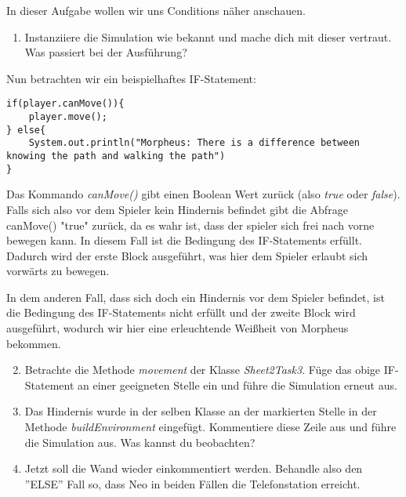 In dieser Aufgabe wollen wir uns Conditions näher anschauen.
\begin{enumerate}                           
    \item Instanziiere die Simulation wie bekannt und mache dich mit dieser vertraut.
    Was passiert bei der Ausführung?
\end{enumerate}

\begin{Infobox}[IF-Condition]
    Nun betrachten wir ein beispielhaftes IF-Statement:
    \begin{lstlisting}[breaklines=true, numbers=none]
if(player.canMove()){
    player.move();
} else{
    System.out.println("Morpheus: There is a difference between knowing the path and walking the path")
}
    \end{lstlisting}
    Das Kommando \textit{canMove()} gibt einen Boolean Wert zurück (also \textit{true} oder \textit{false}).
    Falls sich also vor dem Spieler kein Hindernis befindet gibt die Abfrage canMove() "true" zurück, da es wahr ist, dass der spieler sich frei nach vorne bewegen kann.
   In diesem Fall ist die Bedingung des IF-Statements erfüllt. Dadurch wird der erste Block
    ausgeführt, was hier dem Spieler erlaubt sich vorwärts zu bewegen.\par 
    In dem anderen Fall, dass sich doch ein Hindernis vor dem Spieler befindet, ist die Bedingung des IF-Statements nicht erfüllt und 
    der zweite Block wird ausgeführt, wodurch wir hier eine erleuchtende Weißheit von Morpheus bekommen.
\end{Infobox}
\begin{enumerate} \setcounter{enumi}{1}
    \item Betrachte die Methode \textit{movement} der Klasse \textit{Sheet2Task3}. Füge das obige IF-Statement an einer geeigneten Stelle ein 
    und führe die Simulation erneut aus.
    \item Das Hindernis wurde in der selben Klasse an der markierten Stelle in der Methode \textit{buildEnvironment} eingefügt.
    Kommentiere diese Zeile aus und führe die Simulation aus. Was kannst du beobachten?
    \item Jetzt soll die Wand wieder einkommentiert werden. Behandle also den ''ELSE'' Fall so, dass Neo in beiden Fällen die Telefonstation erreicht.

\end{enumerate}
